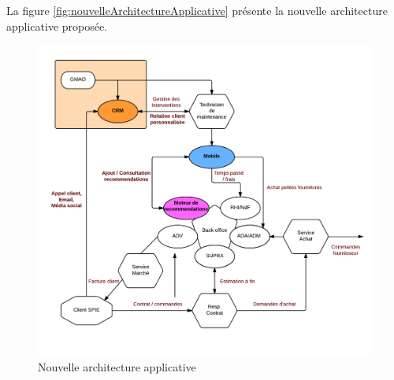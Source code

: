 La figure \vref{fig:nouvelleArchitectureApplicative} présente la nouvelle architecture applicative proposée.

\begin{figure}[h!]
	\centering
	\includegraphics[width=1\linewidth]{images/cartographie_applicative_amelioree.png}
	\caption{Nouvelle architecture applicative}
	\label{fig:nouvelleArchitectureApplicative}
\end{figure}

